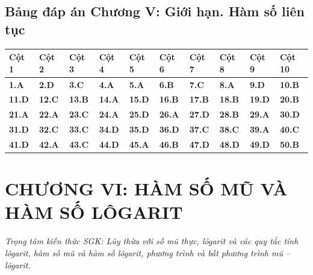 \documentclass[11pt,a4paper]{article}
\begin{document}
\subsection*{\color{primary} Bảng đáp án Chương V: Giới hạn. Hàm số liên tục}
\begin{center}
\renewcommand{\arraystretch}{1.25}
\begin{tabularx}{\textwidth}{*{10}{>{\centering\arraybackslash}X}}
\toprule
\textbf{\color{primary} Cột 1} & \textbf{\color{primary} Cột 2} & \textbf{\color{primary} Cột 3} & \textbf{\color{primary} Cột 4} & \textbf{\color{primary} Cột 5} & \textbf{\color{primary} Cột 6} & \textbf{\color{primary} Cột 7} & \textbf{\color{primary} Cột 8} & \textbf{\color{primary} Cột 9} & \textbf{\color{primary} Cột 10} \\
\midrule
\textbf{1.A} & \textbf{2.D} & \textbf{3.C} & \textbf{4.A} & \textbf{5.A} & \textbf{6.B} & \textbf{7.C} & \textbf{8.A} & \textbf{9.D} & \textbf{10.B} \\
\rowcolor{rowtint} \textbf{11.D} & \textbf{12.C} & \textbf{13.B} & \textbf{14.A} & \textbf{15.D} & \textbf{16.B} & \textbf{17.B} & \textbf{18.B} & \textbf{19.D} & \textbf{20.B} \\
\textbf{21.A} & \textbf{22.A} & \textbf{23.C} & \textbf{24.A} & \textbf{25.D} & \textbf{26.A} & \textbf{27.D} & \textbf{28.B} & \textbf{29.A} & \textbf{30.D} \\
\rowcolor{rowtint} \textbf{31.D} & \textbf{32.C} & \textbf{33.C} & \textbf{34.D} & \textbf{35.D} & \textbf{36.D} & \textbf{37.C} & \textbf{38.C} & \textbf{39.A} & \textbf{40.C} \\
\textbf{41.D} & \textbf{42.A} & \textbf{43.C} & \textbf{44.D} & \textbf{45.A} & \textbf{46.B} & \textbf{47.D} & \textbf{48.D} & \textbf{49.D} & \textbf{50.B} \\
\bottomrule
\end{tabularx}
\end{center}\vspace{10pt}
\section*{\color{primary} CHƯƠNG VI: HÀM SỐ MŨ VÀ HÀM SỐ LÔGARIT}
\textit{Trọng tâm kiến thức SGK: Lũy thừa với số mũ thực, lôgarit và các quy tắc tính lôgarit, hàm số mũ và hàm số lôgarit, phương trình và bất phương trình mũ – lôgarit.}\par\vspace{4pt}
\end{document}
